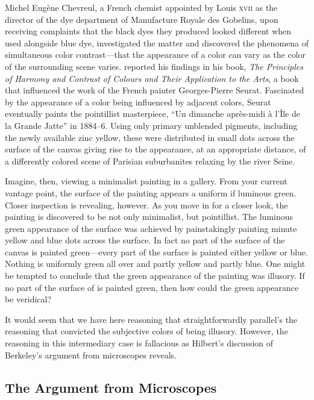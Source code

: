 \documentclass[12pt]{article}
\begin{document}
Michel Eugène Chevreul, a French chemist appointed by Louis \textsc{xvii} as the director of the dye department of Manufacture Royale des Gobelins, upon receiving complaints that the black dyes they produced looked different when used alongside blue dye, investigated the matter and discovered the phenomena of simultaneous color contrast---that the appearance of a color can vary as the color of the surrounding scene varies. \citet{Chevreul:1855kx} reported his findings in his book, \emph{The Principles of Harmony and Contrast of Colours and Their Application to the Arts}, a book that influenced the work of the French painter Georges-Pierre Seurat. Fascinated by the appearance of a color being influenced by adjacent colors, Seurat eventually paints the pointillist masterpiece, “Un dimanche après-midi à l'Île de la Grande Jatte” in 1884--6. Using only primary unblended pigments, including the newly available zinc yellow, these were distributed in small dots across the surface of the canvas giving rise to the appearance, at an appropriate distance, of a differently colored scene of Parisian suburbanites relaxing by the river Seine.

Imagine, then, viewing a minimalist painting in a gallery. From your current vantage point, the surface of the painting appears a uniform if luminous green. Closer inspection is revealing, however. As you move in for a closer look, the painting is discovered to be not only minimalist, but pointillist. The luminous green appearance of the surface was achieved by painstakingly painting minute yellow and blue dots across the surface. In fact no part of the surface of the canvas is painted green---every part of the surface is painted either yellow or blue. Nothing is uniformly green all over and partly yellow and partly blue. One might be tempted to conclude that the green appearance of the painting was illusory. If no part of the surface of is painted green, then how could the green appearance be veridical? 

It would seem that we have here reasoning that straightforwardly parallel's the reasoning that convicted the subjective colors of being illusory. However, the reasoning in this intermediary case is fallacious as Hilbert's \citeyear{Hilbert:1987jq} discussion of Berkeley's \citeyear{Berkeley:1734fk} argument from microscopes reveals.


\subsection{The Argument from Microscopes}\label{sub:the_argument_from_microscopes} %
\end{document}
